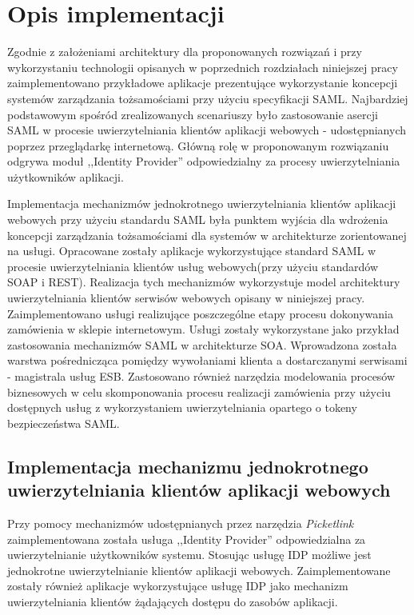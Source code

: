 \chapter{Opis implementacji}
\label{cha:implementacja}

{\it

Zgodnie z założeniami architektury dla proponowanych rozwiązań i przy wykorzystaniu technologii opisanych w poprzednich rozdziałach niniejszej pracy zaimplementowano przykładowe aplikacje prezentujące wykorzystanie koncepcji systemów zarządzania tożsamościami przy użyciu specyfikacji SAML. Najbardziej podstawowym spośród zrealizowanych scenariuszy było zastosowanie asercji SAML w procesie uwierzytelniania klientów aplikacji webowych - udostępnianych poprzez przeglądarkę internetową. Główną rolę w proponowanym rozwiązaniu odgrywa moduł ,,Identity Provider'' odpowiedzialny za procesy uwierzytelniania użytkowników aplikacji.

Implementacja mechanizmów jednokrotnego uwierzytelniania klientów aplikacji webowych przy użyciu standardu SAML była punktem wyjścia dla wdrożenia koncepcji zarządzania tożsamościami dla systemów w architekturze zorientowanej na usługi. Opracowane zostały aplikacje wykorzystujące standard SAML w procesie uwierzytelniania klientów usług webowych(przy użyciu standardów SOAP i REST). Realizacja tych mechanizmów wykorzystuje model architektury uwierzytelniania klientów serwisów webowych opisany w niniejszej  pracy. Zaimplementowano usługi realizujące poszczególne etapy procesu dokonywania zamówienia w sklepie internetowym. Usługi zostały wykorzystane jako przykład zastosowania mechanizmów SAML w architekturze SOA. Wprowadzona została warstwa pośrednicząca pomiędzy wywołaniami klienta a dostarczanymi serwisami - magistrala usług ESB. Zastosowano również narzędzia modelowania procesów biznesowych w celu skomponowania procesu realizacji zamówienia przy użyciu dostępnych usług z wykorzystaniem uwierzytelniania opartego o tokeny bezpieczeństwa SAML. 

}


\section{Implementacja mechanizmu jednokrotnego uwierzytelniania klientów aplikacji webowych}

	Przy pomocy mechanizmów udostępnianych przez narzędzia \textit{Picketlink} zaimplementowana została usługa ,,Identity Provider'' odpowiedzialna za uwierzytelnianie użytkowników systemu. Stosując usługę IDP możliwe jest jednokrotne uwierzytelnianie klientów aplikacji webowych. Zaimplementowane zostały również aplikacje wykorzystujące usługę IDP jako mechanizm uwierzytelniania klientów żądających dostępu do zasobów aplikacji.

